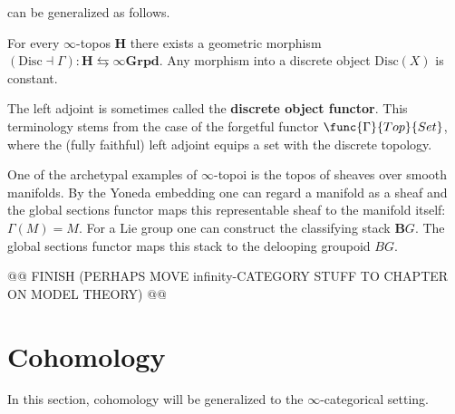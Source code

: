      can be generalized as follows.
    \begin{property}
        For every $\infty$-topos $\mathbf{H}$ there exists a geometric morphism $(\mathrm{Disc}\dashv\Gamma):\mathbf{H}\leftrightarrows\infty\mathbf{Grpd}$. Any morphism into a discrete object $\mathrm{Disc}(X)$ is constant.

        The left adjoint is sometimes called the \textbf{discrete object functor}. This terminology stems from the case of the forgetful functor $\func{\Gamma}{Top}{Set}$, where the (fully faithful) left adjoint equips a set with the discrete topology.
    \end{property}
    \begin{example}
        One of the archetypal examples of $\infty$-topoi is the topos of sheaves over smooth manifolds. By the Yoneda embedding one can regard a manifold as a sheaf and the global sections functor maps this representable sheaf to the manifold itself: $\Gamma(M)=M$. For a Lie group one can construct the classifying stack $\mathbf{B}G$. The global sections functor maps this stack to the delooping groupoid $BG$.
    \end{example}


    @@ FINISH (PERHAPS MOVE infinity-CATEGORY STUFF TO CHAPTER ON MODEL THEORY) @@

\section{Cohomology}

    In this section, cohomology will be generalized to the $\infty$-categorical setting.

